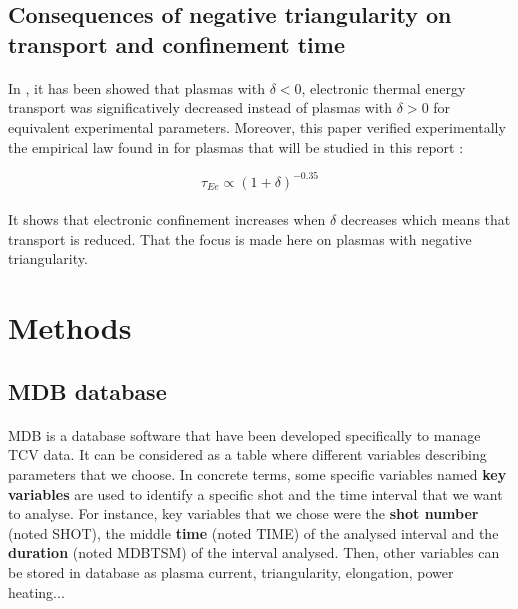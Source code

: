 \documentclass[12pt]{article}
\begin{document}
\subsection{Consequences of negative triangularity on transport and confinement time}

\paragraph{}
In \cite{yann_camenen_etude_2006}, it has been showed that plasmas with \(\delta < 0\), electronic thermal energy transport was significatively decreased instead of plasmas with \(\delta > 0\) for equivalent experimental parameters. Moreover, this paper verified experimentally the empirical law found in \cite{A_Pochelon_1999} for plasmas that will be studied in this report :

\begin{equation}
    \tau_{Ee} \propto (1+\delta)^{-0.35}
\end{equation}

\paragraph{}
It shows that electronic confinement increases when \(\delta\) decreases which means that transport is reduced. That the focus is made here on plasmas with negative triangularity. 





\section{Methods}

\subsection{MDB database}

\paragraph{}
MDB is a database software that have been developed specifically to manage TCV data. It can be  considered as a table where different variables describing parameters that we choose. In concrete terms, some specific variables named \textbf{key variables} are used to identify a specific shot and the time interval that we want to analyse. For instance, key variables that we chose were the \textbf{shot number} (noted SHOT), the middle \textbf{time} (noted TIME) of the analysed interval and the \textbf{duration} (noted MDBTSM) of the interval analysed. Then, other variables can be stored in database as plasma current, triangularity, elongation, power heating...
\end{document}
